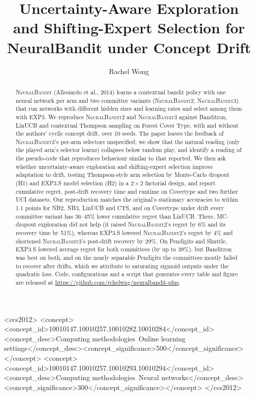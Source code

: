\documentclass[sigconf]{acmart}
\newcommand{\NB}{\textsc{NeuralBandit}}
\begin{document}
\title{Uncertainty-Aware Exploration and Shifting-Expert Selection for NeuralBandit under Concept Drift}
\author{Rachel Wong}
\renewcommand{\shortauthors}{Wong}

\begin{abstract}
\NB{} (Allesiardo et al., 2014) learns a contextual bandit policy with one neural network per arm and two committee
variants (\NB{}2, \NB{}3) that run networks with different hidden sizes and learning rates and select among them with
EXP3. We reproduce \NB{}2 and \NB{}3 against Banditron, LinUCB and contextual Thompson sampling on Forest Cover Type,
with and without the authors' cyclic concept drift, over 10 seeds. The paper leaves the feedback of \NB{}3's per-arm
selectors unspecified; we show that the natural reading (only the played arm's selector learns) collapses below random
play, and identify a reading of the pseudo-code that reproduces behaviour similar to that reported. We then ask whether
uncertainty-aware exploration and shifting-expert selection improve adaptation to drift, testing Thompson-style arm
selection by Monte-Carlo dropout (H1) and EXP3.S model selection (H2) in a $2\times2$ factorial design, and report
cumulative regret, post-drift recovery time and runtime on Covertype and two further UCI datasets.
Our reproduction matches the original's stationary accuracies to within 1.1 points for NB2, NB3, LinUCB and CTS, and
on Covertype under drift every committee variant has 36--45\% lower cumulative regret than LinUCB. There, MC-dropout
exploration did not help (it raised \NB{}2's regret by 6\% and its recovery time by 51\%), whereas EXP3.S lowered \NB{}2's regret by
4\% and shortened \NB{}3's post-drift recovery by 29\%. On Pendigits and Shuttle, EXP3.S lowered average regret for both
committees (by up to 39\%), but Banditron was best on both, and on the nearly separable Pendigits the committees
mostly failed to recover after drifts, which we attribute to saturating sigmoid outputs under the quadratic loss.
Code, configurations and a script that generates every table and figure are released at
\url{https://github.com/rchelwng/neuralbandit-plus}.
\end{abstract}

\begin{CCSXML}
<ccs2012>
 <concept><concept_id>10010147.10010257.10010282.10010284</concept_id>
  <concept_desc>Computing methodologies~Online learning settings</concept_desc><concept_significance>500</concept_significance></concept>
 <concept><concept_id>10010147.10010257.10010293.10010294</concept_id>
  <concept_desc>Computing methodologies~Neural networks</concept_desc><concept_significance>300</concept_significance></concept>
</ccs2012>
\end{CCSXML}
\end{document}
